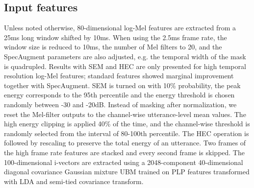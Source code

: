 \documentclass[a4paper]{article}
\begin{document}
\vspace{-1.5mm}
\subsection{Input features}
\vspace{-1mm}
Unless noted otherwise, 80-dimensional log-Mel features are extracted from a 25ms long window shifted by 10ms.
When using the 2.5ms frame rate, the window size is reduced to 10ms, the number of Mel filters to 20, and the SpecAugment parameters are also adjusted, e.g. the temporal width of the mask is quadrupled.
Results with SEM and HEC are only presented for high temporal resolution log-Mel features; standard features showed marginal improvement together with SpecAugment.
SEM is turned on with 10\% probability, the peak energy corresponds to the 95th percentile and the energy threshold is chosen randomly between -30 and -20dB.
Instead of masking after normalization, we reset the Mel-filter outputs to the channel-wise utterance-level mean values.
The high energy clipping is applied 40\% of the time, and the channel-wise threshold  is randomly selected from the interval of 80-100th percentile.
The HEC operation is followed by rescaling to preserve the total energy of an utterance.
Two frames of the high frame rate features are stacked and every second frame is skipped.
The 100-dimensional i-vectors are extracted using a 2048-component 40-dimensional diagonal covariance Gaussian mixture UBM trained on PLP features transformed with LDA and semi-tied covariance transform.

\vspace{-1.5mm}
\end{document}
